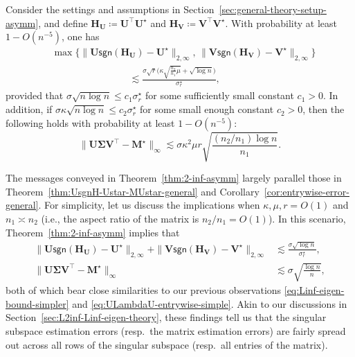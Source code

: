 \begin{theorem}
\label{thm:2-inf-asymm}
%
Consider the settings and
assumptions in Section~\ref{sec:general-theory-setup-asymm}, and
define $\bm{H}_{\bm{U}}\coloneqq\bm{U}^{\top}\bm{U}^{\star}$ and
$\bm{H}_{\bm{V}}\coloneqq\bm{V}^{\top}\bm{V}^{\star}$. With probability
at least $1-O(n^{-5})$, one has
%
\begin{align}
	& \max\Big\{\|\bm{U}\mathsf{sgn}(\bm{H}_{\bm{U}})-\bm{U}^{\star}\|_{2,\infty},\, \|\bm{V}\mathsf{sgn}(\bm{H}_{\bm{V}})-\bm{V}^{\star}\|_{2,\infty} \Big\} \nonumber\\
	& \qquad\qquad\qquad\qquad \lesssim\frac{\sigma\sqrt{ r}\big(\kappa\sqrt{\frac{n_{2}}{n_{1}}\mu}+\sqrt{\log n}\big)}{\sigma_{r}^{\star}},\label{eq:main-result-2-infty-general-asymm}
\end{align}
%
provided that $\sigma\sqrt{n\log n}\leq c_{1}\sigma_{r}^{\star}$
for some sufficiently small constant $c_{1}>0$. In addition, if $\sigma\kappa\sqrt{n\log n}\leq c_{2}\sigma_{r}^{\star}$
for some small enough constant $c_{2}>0$, then the following holds with
probability at least $1-O(n^{-5})$:
%
\begin{equation}
	\|\bm{U}\bm{\Sigma}\bm{V}^{\top}-\bm{M}^{\star}\|_{\infty}\lesssim\sigma\kappa^{2}\mu r\sqrt{\frac{(n_2/n_1) \log n}{n_{1}}}.\label{eq:main-result-infty-general-asymm}
\end{equation}
%
\end{theorem}



The messages conveyed in Theorem~\ref{thm:2-inf-asymm} largely parallel those in Theorem~\ref{thm:UsgnH-Ustar-MUstar-general} and Corollary~\ref{cor:entrywise-error-general}.
For simplicity, let us discuss the implications when $\kappa, \mu, r = O(1)$ and $n_1 \asymp n_2$ (i.e., the aspect ratio of the matrix is $n_2 / n_1 = O(1)$).
In this scenario, Theorem~\ref{thm:2-inf-asymm} implies that
%
\begin{align*}
\|\bm{U}\mathsf{sgn}(\bm{H}_{\bm{U}})-\bm{U}^{\star}\|_{2,\infty}+\|\bm{V}\mathsf{sgn}(\bm{H}_{\bm{V}})-\bm{V}^{\star}\|_{2,\infty} & \lesssim\frac{\sigma\sqrt{\log n}}{\sigma_{r}^{\star}},\\
\|\bm{U}\bm{\Sigma}\bm{V}^{\top}-\bm{M}^{\star}\|_{\infty} & \lesssim\sigma  \sqrt{\frac{\log n}{n}},
\end{align*}
%
both of which bear close similarities to our previous observations \eqref{eq:Linf-eigen-bound-simpler} and \eqref{eq:ULambdaU-entrywise-simple}. Akin to our discussions in Section~\ref{sec:L2inf-Linf-eigen-theory}, these findings tell us that the  singular subspace estimation errors (resp.~the matrix estimation errors)  are fairly spread out across all rows of the singular subspace (resp.~all entries of the matrix).




